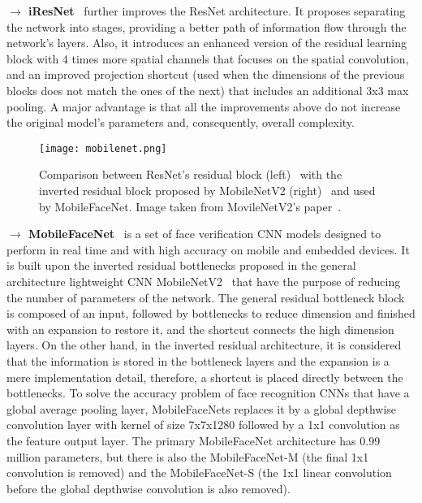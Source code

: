 \documentclass[class=report, crop=false, a4paper, 12pt]{standalone}
\begin{document}
\vspace{0.7\baselineskip}
\noindent\textbf{$\rightarrow$ iResNet}~\autocite{dutaImprovedResidualNetworks2021} further improves the ResNet architecture. It proposes separating the network into stages, providing a better path of information flow through the network's layers. Also, it introduces an enhanced version of the residual learning block with 4 times more spatial channels that focuses on the spatial convolution, and an improved projection shortcut (used when the dimensions of the previous blocks does not match the ones of the next) that includes an additional 3x3 max pooling. A major advantage is that all the improvements above do not increase the original model's parameters and, consequently, overall complexity.

\vspace{0.7\baselineskip}
\begin{figure}[H]
    \centering
    \texttt{[image: mobilenet.png]}
    \caption{Comparison between ResNet's residual block (left)~\autocite{chenMobileFaceNetsEfficientCNNs2018} with the inverted residual block proposed by MobileNetV2 (right)~\autocite{sandlerMobileNetV2InvertedResiduals2019} and used by MobileFaceNet. Image taken from MovileNetV2's paper~\autocite{sandlerMobileNetV2InvertedResiduals2019}.}
    \label{fig:mobilefacenet}
\end{figure}

\label{mobilefacenet}
\noindent\textbf{$\rightarrow$ MobileFaceNet}~\autocite{chenMobileFaceNetsEfficientCNNs2018} is a set of face verification CNN models designed to perform in real time and with high accuracy on mobile and embedded devices. It is built upon the inverted residual bottlenecks  proposed in the general architecture lightweight CNN MobileNetV2~\autocite{sandlerMobileNetV2InvertedResiduals2019} that have the purpose of reducing the number of parameters of the network. The general residual bottleneck block~\autocite{heDeepResidualLearning2016} is composed of an input, followed by bottlenecks to reduce dimension and finished with an expansion to restore it, and the shortcut connects the high dimension layers. On the other hand, in the inverted residual architecture, it is considered that the information is stored in the bottleneck layers and the expansion is a mere implementation detail, therefore, a shortcut is placed directly between the bottlenecks. To solve the accuracy problem of face recognition CNNs that have a global average pooling layer, MobileFaceNets replaces it by a global depthwise convolution layer with kernel of size 7x7x1280 followed by a 1x1 convolution as the feature output layer. The primary MobileFaceNet architecture has 0.99 million parameters, but there is also the MobileFaceNet-M (the final 1x1 convolution is removed) and the MobileFaceNet-S (the 1x1 linear convolution before the global depthwise convolution is also removed).
\end{document}
